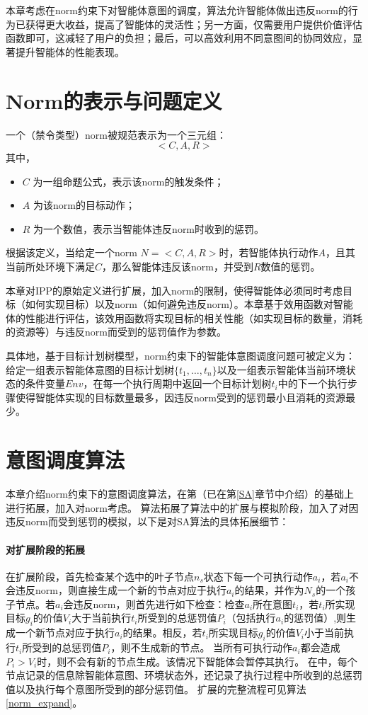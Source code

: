 本章考虑在norm约束下对智能体意图的调度，\SAN 算法允许智能体做出违反norm的行为已获得更大收益，提高了智能体的灵活性；另一方面，\SAN 仅需要用户提供价值评估函数即可，这减轻了用户的负担；最后，\SAN 可以高效利用不同意图间的协同效应，显著提升智能体的性能表现。

\section{Norm的表示与问题定义}
一个（禁令类型）norm被规范表示为一个三元组：
$$<C,A,R>$$
其中，
\begin{itemize}
  \item $C$ 为一组命题公式，表示该norm的触发条件；
  \item $A$ 为该norm的目标动作；
  \item $R$ 为一个数值，表示当智能体违反norm时收到的惩罚。
\end{itemize}

根据该定义，当给定一个norm $N=<C,A,R>$时，若智能体执行动作$A$，且其当前所处环境下满足$C$，那么智能体违反该norm，并受到$R$数值的惩罚。

本章对IPP的原始定义进行扩展，加入norm的限制，使得智能体必须同时考虑目标（如何实现目标）以及norm（如何避免违反norm）。本章基于效用函数对智能体的性能进行评估，该效用函数将实现目标的相关性能（如实现目标的数量，消耗的资源等）与违反norm而受到的惩罚值作为参数。

具体地，基于目标计划树模型，norm约束下的智能体意图调度问题可被定义为：给定一组表示智能体意图的目标计划树$\{t_1, \dots, t_n\}$以及一组表示智能体当前环境状态的条件变量$Env$，在每一个执行周期中返回一个目标计划树$t_i$中的下一个执行步骤使得智能体实现的目标数量最多，因违反norm受到的惩罚最小且消耗的资源最少。

\section{\SAN 意图调度算法}
本章介绍norm约束下的意图调度算法\SAN，\SAN 在第\SA （已在第\ref{SA}章节中介绍）的基础上进行拓展，加入对norm考虑。
\SAN 算法拓展了\SA 算法中的扩展与模拟阶段，加入了对因违反norm而受到惩罚的模拟，以下是对SA算法的具体拓展细节：
\paragraph{对扩展阶段的拓展}
在扩展阶段，\SAN 首先检查某个选中的叶子节点$n_s$状态下每一个可执行动作$a_i$，若$a_i$不会违反norm，则直接生成一个新的节点对应于执行$a_i$的结果，并作为$N_s$的一个孩子节点。若$a_i$会违反norm，则首先进行如下检查：检查$a_i$所在意图$t_i$，若$t_i$所实现目标$g_i$的价值$V_i$大于当前执行$t_i$所受到的总惩罚值$P_i$（包括执行$a_i$的惩罚值）,则生成一个新节点对应于执行$a_i$的结果。相反，若$t_i$所实现目标$g_i$的价值$V_i$小于当前执行$t_i$所受到的总惩罚值$P_i$，则不生成新的节点。
%
当所有可执行动作$a_i$都会造成$P_i > V_i$时，则不会有新的节点生成。该情况下智能体会暂停其执行。
在\SAN 中，每个节点记录的信息除智能体意图、环境状态外，还记录了执行过程中所收到的总惩罚值以及执行每个意图所受到的部分惩罚值。
扩展的完整流程可见算法\ref{norm_expand}。

